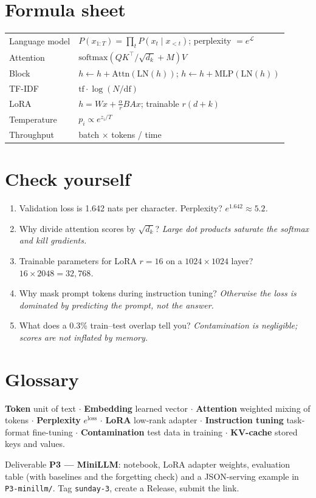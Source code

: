 \documentclass[11pt,a4paper]{article}
\begin{document}
\section*{Formula sheet}
\begin{tabularx}{\linewidth}{@{}l X@{}}
\toprule
Language model & $P(x_{1:T})=\prod_tP(x_t\mid x_{<t})$; \; perplexity $=e^{\mathcal{L}}$\\
Attention & $\mathrm{softmax}(QK^\top/\sqrt{d_k}+M)V$\\
Block & $h\leftarrow h+\mathrm{Attn}(\mathrm{LN}(h))$; \; $h\leftarrow h+\mathrm{MLP}(\mathrm{LN}(h))$\\
TF-IDF & $\mathrm{tf}\cdot\log(N/\mathrm{df})$\\
LoRA & $h=Wx+\frac{\alpha}{r}BAx$; \; trainable $r(d+k)$\\
Temperature & $p_i\propto e^{z_i/T}$\\
Throughput & batch $\times$ tokens / time\\
\bottomrule
\end{tabularx}

\section*{Check yourself}
\begin{enumerate}
\item Validation loss is 1.642 nats per character. Perplexity? \emph{$e^{1.642}\approx5.2$.}
\item Why divide attention scores by $\sqrt{d_k}$? \emph{Large dot products saturate the softmax and kill gradients.}
\item Trainable parameters for LoRA $r=16$ on a $1024\times1024$ layer? \emph{$16\times2048=32{,}768$.}
\item Why mask prompt tokens during instruction tuning? \emph{Otherwise the loss is dominated by predicting the prompt, not the answer.}
\item What does a 0.3\% train--test overlap tell you? \emph{Contamination is negligible; scores are not inflated by memory.}
\end{enumerate}

\section*{Glossary}
\textbf{Token} unit of text $\cdot$ \textbf{Embedding} learned vector $\cdot$ \textbf{Attention} weighted mixing of tokens $\cdot$ \textbf{Perplexity} $e^{\text{loss}}$ $\cdot$ \textbf{LoRA} low-rank adapter $\cdot$ \textbf{Instruction tuning} task-format fine-tuning $\cdot$ \textbf{Contamination} test data in training $\cdot$ \textbf{KV-cache} stored keys and values.

\begin{submitbox}
Deliverable \textbf{P3 --- MiniLLM}: notebook, LoRA adapter weights, evaluation table (with baselines and the forgetting check) and a JSON-serving example in \texttt{P3-minillm/}. Tag \texttt{sunday-3}, create a Release, submit the link.
\end{submitbox}


\end{document}
